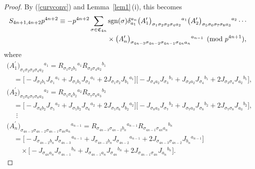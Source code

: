 \documentclass[10pt,a4paper]{amsart}
\numberwithin{equation}{section}
\theoremstyle{definition}
\newcommand{\sgn}{{\rm sgn}}
\newcommand{\barcurvature}[2]{R_{#1}{}^{#2}}
\begin{document}
\begin{proof}
By (\ref{curvconv}) and Lemma~\ref{lem1}\,(i), this becomes
\begin{gather*}
S_{4n+1,4n+2}p^{4n+2}
 \equiv -p^{4n+2} \sum_{\sigma\in \mathfrak{C}_{4n}}
 \sgn(\sigma)
 \delta_{a_1}^{a_n}
 \bigl({A_1^\prime}\bigr)_{\sigma_1 \sigma_2 \sigma_3 \sigma_4 a_2}{}^{a_1}
 \bigl({A_2^\prime}\bigr)_{\sigma_5 \sigma_6 \sigma_7 \sigma_8 a_3}{}^{a_2}\cdots
 \\
\hphantom{S_{4n+1,4n+2}p^{4n+2} \equiv -p^{4n+2} \sum_{\sigma\in \mathfrak{C}_{4n}}}{}
 {}\times
\bigl({A_n^\prime}\bigr)_{\sigma_{4n-3} \sigma_{4n-2} \sigma_{4n-1} \sigma_{4n} a_n}{}^{a_{n-1}}
\pmod{p^{4n+1}},
\end{gather*}
where
\begin{gather*}
{\bigl({A_1^\prime}\bigr)_{\sigma_1 \sigma_2 \sigma_3 \sigma_4 a_2}{}^{a_1} = \barcurvature{\sigma_1 \sigma_2 b_1}{a_1}
\barcurvature{\sigma_3 \sigma_4 a_2}{b_1} }
 \\ \nonumber
\quad{}=\bigl[-J_{\sigma_2 b_1} J_{\sigma_1}{}^{a_1}
 +J_{\sigma_1 b_1} J_{\sigma_2}{}^{a_1}
 +2 J_{\sigma_1 \sigma_2} J_{b_1}{}^{a_1} \bigr]
\bigl[-J_{\sigma_4 a_2} J_{\sigma_3}{}^{b_1} +J_{\sigma_3 a_2} J_{\sigma_4}{}^{b_1}
 +2 J_{\sigma_3 \sigma_4} J_{a_2}{}^{b_1}\bigr],
\\ \nonumber
{\bigl({A_2^\prime}\bigr)_{\sigma_5 \sigma_6 \sigma_7 \sigma_8 a_3}{}{}^{a_2}
= \barcurvature{\sigma_5 \sigma_6 b_2}{a_2}
\barcurvature{\sigma_7 \sigma_8 a_3}{b_2}}
 \\ \nonumber
\quad{}=\bigl[-J_{\sigma_6 b_2} J_{\sigma_5}{}^{a_2}
 +J_{\sigma_5 b_2} J_{\sigma_6}{}^{a_2}
 +2 J_{\sigma_5 \sigma_6} J_{b_2}{}^{a_2} \bigr]
 \bigl[-J_{\sigma_8 a_3} J_{\sigma_7}{}^{b_2}
 +J_{\sigma_7 a_3} J_{\sigma_8}{}^{b_2}
 +2 J_{\sigma_7 \sigma_8} J_{a_3}{}^{b_2} \bigr],
 \\ \nonumber
\quad \ \, {} \vdots \\
{\bigl({A_n^\prime}\bigr)_{\sigma_{4n-3} \sigma_{4n-2} \sigma_{4n-1} \sigma_{4n} a_n}{}^{a_{n-1}}
=\barcurvature{\sigma_{4n-3} \sigma_{4n-2} b_{n}}{a_{n-1}}
\barcurvature{\sigma_{4n-1} \sigma_{4n} a_n}{b_{n}}}
\\ \nonumber
\quad{}=\bigl[-J_{\sigma_{4n-2} b_{n}} J_{\sigma_{4n-3}}{}^{a_{n-1}}
 +J_{\sigma_{4n-3} b_{n}} J_{\sigma_{4n-2}}{}^{a_{n-1}}
 +2 J_{\sigma_{4n-3} \sigma_{4n-2}} J_{b_{n}}{}^{a_{n-1}} \bigr]
 \\ \nonumber
 \quad\quad{} \times
\bigl[-J_{\sigma_{4n} a_n} J_{\sigma_{4n-1}}{}^{b_{n}}
 +J_{\sigma_{4n-1} a_n}
 J_{\sigma_{4n}}{}^{b_{n}}
 +2 J_{\sigma_{4n-1} \sigma_{4n}}
 J_{a_n}{}^{b_n} \bigr].

\end{gather*}
\end{proof}
\end{document}
